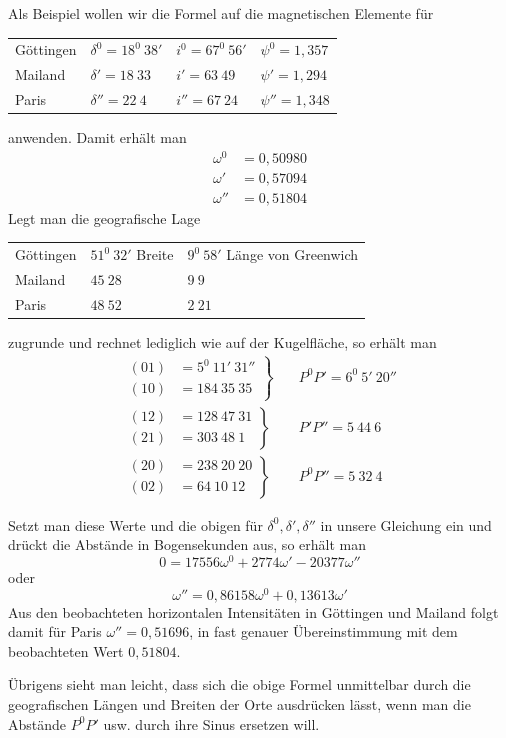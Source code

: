 Als Beispiel wollen wir die Formel auf die magnetischen Elemente für
\begin{center}
\begin{tabular}{l|l|l|l}
Göttingen&$\delta^0=18^0\ 38'$&$i^0=67^0\ 56'$&$\psi^0=1{,}357$\\
Mailand&$\delta'=18\ 33$&$i'=63\ 49$&$\psi'=1{,}294$\\
Paris&$\delta''=22\ 4$&$i''=67\ 24$&$\psi''=1{,}348$
\end{tabular}
\end{center}
anwenden. Damit erhält man
\[
\begin{aligned}
\omega^0&=0{,}50980\\
\omega'&=0{,}57094\\
\omega''&=0{,}51804
\end{aligned}
\]
Legt man die geografische Lage
\begin{center}
\begin{tabular}{l|l|l}
Göttingen&$51^0\ 32'$ Breite&$9^0\ 58'$ Länge von Greenwich\\
Mailand&$45\ 28$&$9\ 9$\\
Paris&$48\ 52$&$2\ 21$
\end{tabular}
\end{center}
zugrunde und rechnet lediglich wie auf der Kugelfläche, so erhält man
\[
\begin{aligned}
\left.\begin{aligned}(01)&=5^0\ 11'\ 31''\\(10)&=184\ 35\ 35\end{aligned}\right\}&\quad P^0P'=6^0\ 5'\ 20''\\[4pt]
\left.\begin{aligned}(12)&=128\ 47\ 31\\(21)&=303\ 48\ 1\end{aligned}\right\}&\quad P'P''=5\ 44\ 6\\[4pt]
\left.\begin{aligned}(20)&=238\ 20\ 20\\(02)&=64\ 10\ 12\end{aligned}\right\}&\quad P^0P''=5\ 32\ 4
\end{aligned}
\]
\par{}
Setzt man diese Werte und die obigen für $\delta^0,\delta',\delta''$ in unsere Gleichung ein und drückt die Abstände in Bogensekunden aus, so erhält man
\[
0=17556\omega^0+2774\omega'-20377\omega''
\]
oder
\[
\omega''=0{,}86158\omega^0+0{,}13613\omega'
\]
Aus den beobachteten horizontalen Intensitäten in Göttingen und Mailand folgt damit für Paris $\omega''=0{,}51696$, in fast genauer Übereinstimmung mit dem beobachteten Wert $0{,}51804$.

Übrigens sieht man leicht, dass sich die obige Formel unmittelbar durch die geografischen Längen und Breiten der Orte ausdrücken lässt, wenn man die Abstände $P^0P'$ usw. durch ihre Sinus ersetzen will.

